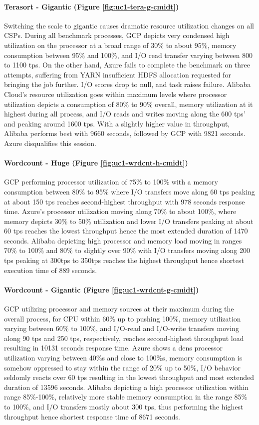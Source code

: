\documentclass[review]{elsarticle}
\begin{document}
\paragraph{Terasort - Gigantic (Figure \ref{fig:uc1-tera-g-cmidt})}Switching the scale to gigantic causes dramatic resource utilization changes on all CSPs. During all benchmark processes, GCP depicts very condensed high utilization on the processor at a broad range of 30\% to about 95\%, memory consumption between 95\% and 100\%, and I/O read transfer varying between 800 to 1100 tps. On the other hand, Azure fails to complete the benchmark on three attempts, suffering from YARN insufficient HDFS allocation requested for bringing the job further. I/O scores drop to null, and task raises failure. Alibaba Cloud's resource utilization goes within maximum levels where processor utilization depicts a consumption of 80\% to 90\% overall, memory utilization at it highest during all process, and I/O reads and writes moving along the 600 tps' and peaking around 1600 tps. With a slightly higher value in throughput, Alibaba performs best with 9660 seconds, followed by GCP with 9821 seconds. Azure disqualifies this session.

\paragraph{Wordcount - Huge (Figure \ref{fig:uc1-wrdcnt-h-cmidt})}GCP performing processor utilization of 75\% to 100\% with a memory consumption between 80\% to 95\% where I/O transfers move along 60 tps peaking at about 150 tps reaches second-highest throughput with 978 seconds response time. Azure's processor utilization moving along 70\% to about 100\%, where memory depicts 30\% to 50\% utilization and lower I/O transfers peaking at about 60 tps reaches the lowest throughput hence the most extended duration of 1470 seconds. Alibaba depicting high processor and memory load moving in ranges 70\% to 100\% and 80\% to slightly over 90\% with I/O transfers moving along 200 tps peaking at 300tps to 350tps reaches the highest throughput hence shortest execution time of 889 seconds.

\paragraph{Wordcount - Gigantic (Figure \ref{fig:uc1-wrdcnt-g-cmidt})}GCP utilizing processor and memory sources at their maximum during the overall process, for CPU within 60\% up to pushing 100\%, memory utilization varying between 60\% to 100\%, and I/O-read and I/O-write transfers moving along 90 tps and 250 tps, respectively, reaches second-highest throughput load resulting in 10131 seconds response time. Azure shows a dens processor utilization varying between 40\%s and close to 100\%s, memory consumption is somehow oppressed to stay within the range of 20\% up to 50\%, I/O behavior seldomly reacts over 60 tps resulting in the lowest throughput and most extended duration of 13596 seconds. Alibaba depicting a high processor utilization within range 85\%-100\%, relatively more stable memory consumption in the range 85\% to 100\%, and I/O transfers mostly about 300 tps, thus performing the highest throughput hence shortest response time of 8671 seconds.
\end{document}
